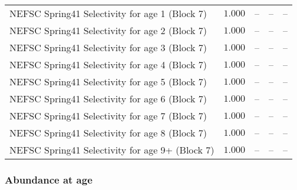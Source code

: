 \documentclass[
]{article}
\begin{document}
\begin{landscape}
\begin{longtable}[t]{lrrrr}
NEFSC Spring41 Selectivity for age 1 (Block 7) & $1.000$ & -- & -- & --\\
NEFSC Spring41 Selectivity for age 2 (Block 7) & $1.000$ & -- & -- & --\\
\addlinespace
NEFSC Spring41 Selectivity for age 3 (Block 7) & $1.000$ & -- & -- & --\\
NEFSC Spring41 Selectivity for age 4 (Block 7) & $1.000$ & -- & -- & --\\
NEFSC Spring41 Selectivity for age 5 (Block 7) & $1.000$ & -- & -- & --\\
NEFSC Spring41 Selectivity for age 6 (Block 7) & $1.000$ & -- & -- & --\\
NEFSC Spring41 Selectivity for age 7 (Block 7) & $1.000$ & -- & -- & --\\
\addlinespace
NEFSC Spring41 Selectivity for age 8 (Block 7) & $1.000$ & -- & -- & --\\
NEFSC Spring41 Selectivity for age 9+ (Block 7) & $1.000$ & -- & -- & --\\*
\end{longtable}
\end{landscape}

\subsubsection{Abundance at age}\label{abundance-at-age}
\end{document}
